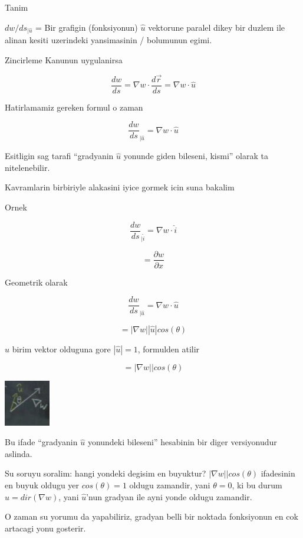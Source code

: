 \documentclass[12pt,fleqn]{article}
\begin{document}
Tanim

$dw / ds_{|\hat{u}}$ = Bir grafigin (fonksiyonun) $\hat{u}$ vektorune paralel dikey bir
duzlem ile alinan kesiti uzerindeki yansimasinin / bolumunun egimi. 

Zincirleme Kanunun uygulanirsa

\[ \frac{dw}{ds} = \nabla w \cdot \frac{d\vec{r}}{ds} 
= \nabla w \cdot \hat{u}
\]

Hatirlamamiz gereken formul o zaman

\[ \frac{dw}{ds}_{|\hat{u}} =  \nabla w \cdot \hat{u} \]


Esitligin sag tarafi ``gradyanin $\hat{u}$ yonunde giden bileseni, kismi''
olarak ta nitelenebilir. 

Kavramlarin birbiriyle alakasini iyice gormek icin suna bakalim

Ornek

\[ \frac{dw}{ds}_{|\hat{i}} =  \nabla w \cdot \hat{i} \]

\[ = \frac{\partial w}{\partial x} \]

Geometrik olarak

\[ \frac{dw}{ds}_{|\hat{u}} =  \nabla w \cdot \hat{u} \]

\[ =  |\nabla w||\hat{u}|cos(\theta)  \]

$\hat{u}$ birim vektor olduguna gore $|\hat{u}| = 1$, formulden atilir

\[ =  |\nabla w||cos(\theta)  \]

\includegraphics[height=2cm]{12_8.png}

Bu ifade ``gradyanin $\hat{u}$ yonundeki bileseni'' hesabinin bir diger
versiyonudur aslinda. 

Su soruyu soralim: hangi yondeki degisim en buyuktur? $|\nabla
w||cos(\theta)$ ifadesinin
en buyuk oldugu yer $cos(\theta)=1$ oldugu zamandir, yani $\theta = 0$, ki
bu durum $\hat{u} = dir(\nabla w)$, yani $\hat{u}$'nun gradyan ile ayni
yonde oldugu zamandir. 

O zaman su yorumu da yapabiliriz, gradyan belli bir noktada fonksiyonun en
cok artacagi yonu gosterir. 
\end{document}
